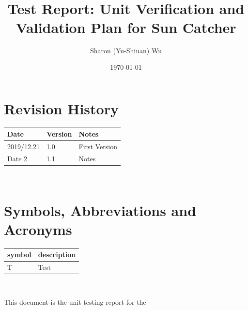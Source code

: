 \documentclass[12pt, titlepage]{article}
\begin{document}
\title{Test Report: Unit Verification and Validation Plan for Sun Catcher} 
\author{Sharon (Yu-Shiuan) Wu}
\date{\today}
	
\maketitle


\section{Revision History}

\begin{tabularx}{\textwidth}{p{3cm}p{2cm}X}
\toprule {\bf Date} & {\bf Version} & {\bf Notes}\\
\midrule
2019/12.21 & 1.0 & First Version\\
Date 2 & 1.1 & Notes\\
\bottomrule
\end{tabularx}

~\newpage

\section{Symbols, Abbreviations and Acronyms}

\renewcommand{\arraystretch}{1.2}
\begin{tabular}{l l} 
  \toprule		
  \textbf{symbol} & \textbf{description}\\
  \midrule 
  T & Test\\
  \bottomrule
\end{tabular}\\


\newpage

\tableofcontents

\listoftables %

\listoffigures %

\newpage


This document is the unit testing report for the \progname
\end{document}
